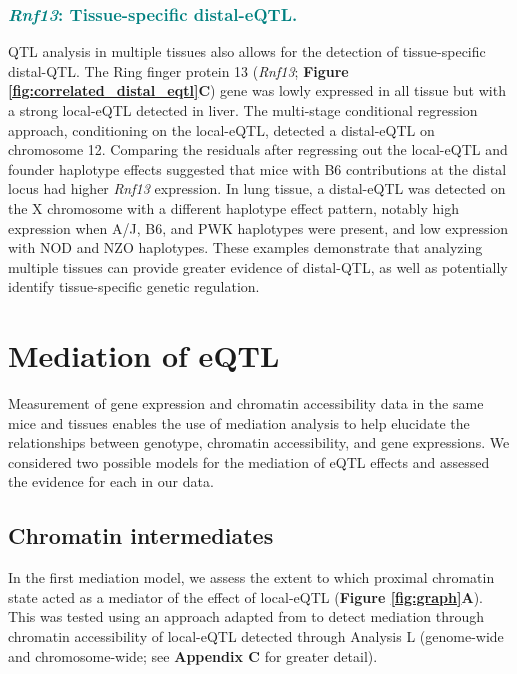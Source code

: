 \documentclass[9pt,twocolumn,twoside]{gsajnl}
\newcommand{\WVinline}[1]{\textcolor{red}{#1}}
\newcommand{\GKinline}[1]{\textcolor{teal}{#1}}
\begin{document}
\subsubsection{\GKinline{\textit{Rnf13}: Tissue-specific distal-eQTL.}}
QTL analysis in multiple tissues also allows for the detection of tissue-specific distal-QTL. The Ring finger protein 13 (\textit{Rnf13}; \textbf{Figure \ref{fig:correlated_distal_eqtl}C}) gene was lowly expressed in all tissue but with a strong local-eQTL detected in liver. The multi-stage conditional regression approach, conditioning on the local-eQTL, detected a distal-eQTL on chromosome 12. Comparing the residuals after regressing out the local-eQTL and founder haplotype effects suggested that mice with B6 contributions at the distal locus had higher \textit{Rnf13} expression. In lung tissue, a distal-eQTL was detected on the X chromosome with a different haplotype effect pattern, notably high expression when A/J, B6, and PWK haplotypes were present, and low expression with NOD and NZO haplotypes. These examples demonstrate that analyzing multiple tissues can provide greater evidence of distal-QTL, as well as potentially identify tissue-specific genetic regulation.

\section{Mediation of eQTL}

Measurement of gene expression and chromatin accessibility data in the same mice and tissues enables the use of mediation analysis to help elucidate the relationships between genotype, chromatin accessibility, and gene expressions. 
We considered two possible models for the mediation of eQTL effects and assessed the evidence for each in our data.


\subsection{Chromatin intermediates}

In the first mediation model, we assess the extent to which proximal chromatin state acted as a mediator of the effect of local-eQTL (\textbf{Figure \ref{fig:graph}A}). This was tested using an approach adapted from \cite{Chick2016} to detect mediation through chromatin accessibility of local-eQTL detected through Analysis L (genome-wide and chromosome-wide; see \textbf{Appendix C} for greater detail).  
\end{document}
